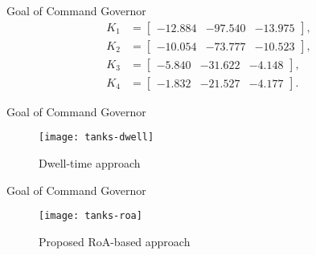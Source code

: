 \begin{slide}{Goal of Command Governor}
  \vspace*{\fill}
  \begin{equation}
    \begin{aligned}
      K_{1} & = \begin{bmatrix} -12.884 & -97.540 & -13.975 \end{bmatrix}, \\
      K_{2} & = \begin{bmatrix} -10.054 & -73.777 & -10.523 \end{bmatrix}, \\
      K_{3} & = \begin{bmatrix} -5.840  & -31.622 & -4.148 \end{bmatrix}, \\
      K_{4} & = \begin{bmatrix} -1.832  & -21.527 & -4.177 \end{bmatrix}.
    \end{aligned}
  \end{equation}
  \vspace*{\fill}
\end{slide}

\begin{slide}{Goal of Command Governor}
  \vspace*{\fill}
  \begin{figure}[ht!]
    \centering \captionsetup{justification=centering}
    \texttt{[image: tanks-dwell]}
    \caption{Dwell-time approach}%
    \label{fig:tanks-dwell}
  \end{figure}
  \vspace*{\fill}
\end{slide}

\begin{slide}{Goal of Command Governor}
  \vspace*{\fill}
  \begin{figure}[ht!]
    \centering \captionsetup{justification=centering}
    \texttt{[image: tanks-roa]}
    \caption{Proposed RoA-based approach}%
    \label{fig:tanks-roa}
  \end{figure}
  \vspace*{\fill}
\end{slide}
